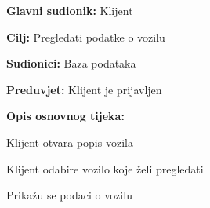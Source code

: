 \noindent {}
\begin{packed_item}
	
	\item \textbf{Glavni sudionik:} Klijent
	\item \textbf{Cilj:} Pregledati podatke o vozilu
	\item \textbf{Sudionici:} Baza podataka
	\item \textbf{Preduvjet:} Klijent je prijavljen
	\item \textbf{Opis osnovnog tijeka:}
	
	\item[] \begin{packed_enum}
		
		\item Klijent otvara popis vozila
		\item Klijent odabire vozilo koje želi pregledati
		\item Prikažu se podaci o vozilu
	
	\end{packed_enum}
\end{packed_item}


